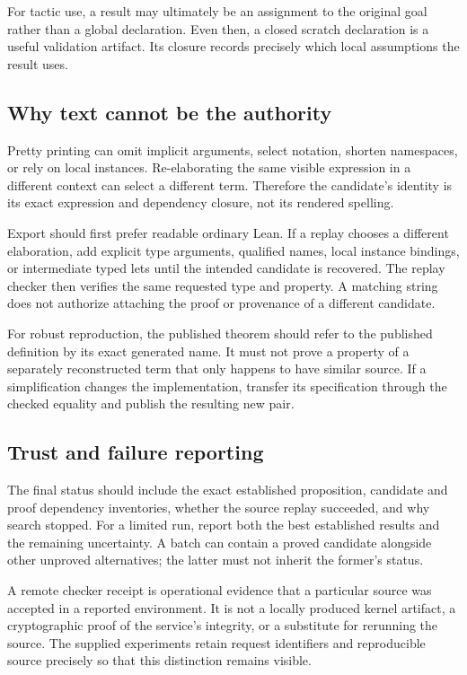 \documentclass[11pt,letterpaper]{article}
\theoremstyle{definition}
\theoremstyle{remark}
\begin{document}
For tactic use, a result may ultimately be an assignment to the original goal rather than a global declaration. Even then, a closed scratch declaration is a useful validation artifact. Its closure records precisely which local assumptions the result uses.

\subsection{Why text cannot be the authority}

Pretty printing can omit implicit arguments, select notation, shorten namespaces, or rely on local instances. Re-elaborating the same visible expression in a different context can select a different term. Therefore the candidate's identity is its exact expression and dependency closure, not its rendered spelling.

Export should first prefer readable ordinary Lean. If a replay chooses a different elaboration, add explicit type arguments, qualified names, local instance bindings, or intermediate typed lets until the intended candidate is recovered. The replay checker then verifies the same requested type and property. A matching string does not authorize attaching the proof or provenance of a different candidate.

For robust reproduction, the published theorem should refer to the published definition by its exact generated name. It must not prove a property of a separately reconstructed term that only happens to have similar source. If a simplification changes the implementation, transfer its specification through the checked equality and publish the resulting new pair.

\subsection{Trust and failure reporting}

The final status should include the exact established proposition, candidate and proof dependency inventories, whether the source replay succeeded, and why search stopped. For a limited run, report both the best established results and the remaining uncertainty. A batch can contain a proved candidate alongside other unproved alternatives; the latter must not inherit the former's status.

A remote checker receipt is operational evidence that a particular source was accepted in a reported environment. It is not a locally produced kernel artifact, a cryptographic proof of the service's integrity, or a substitute for rerunning the source. The supplied experiments retain request identifiers and reproducible source precisely so that this distinction remains visible.
\end{document}
